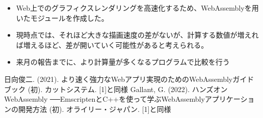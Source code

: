 \newpage

\label{MUSUBI}
\begin{itemize}
	\item Web上でのグラフィクスレンダリングを高速化するため、WebAssemblyを用いたモジュールを作成した。
	\item 現時点では、それほど大きな描画速度の差がないが、計算する数値が増えれば増えるほど、差が開いていく可能性があると考えられる。
	\item 来月の報告までに、より計算量が多くなるプログラムで比較を行う
\end{itemize}
\newpage

\begin{thebibliography}{99}
\small
\setlength\itemsep{-0.5\zh}%
日向俊二. (2021). より速く強力なWebアプリ実現のためのWebAssemblyガイドブック (初). カットシステム.
[1]と同様
Gallant, G. (2022). ハンズオンWebAssembly ──EmscriptenとC++を使って学ぶWebAssemblyアプリケーションの開発方法 (初). オライリー・ジャパン.
[1]と同様
\end{thebibliography}

 
